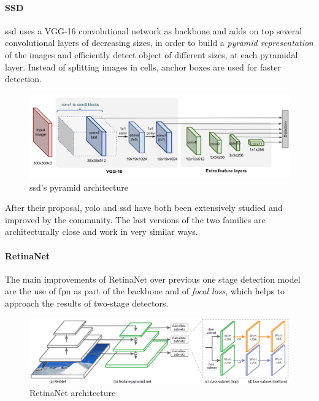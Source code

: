 \documentclass[%
    corpo=12pt,
    twoside,
    stile=classica,   
    tipotesi=magistrale,
    evenboxes,
    english,
	numerazioneromana,
]{toptesi}
\begin{document}
\paragraph{SSD}
\gls{ssd}\cite{Liu_2016} uses a VGG-16 convolutional network as backbone and adds on top several convolutional layers of decreasing sizes, in order to build a \textit{pyramid representation} of the images and efficiently detect object of different sizes, at each pyramidal layer. Instead of splitting images in cells, anchor boxes are used for faster detection.

\begin{figure}[ht]
	\centering
	\includegraphics[width=.9\linewidth]{imgs/SSD-architecture.png}
	\caption{\acrshort{ssd}'s pyramid architecture\cite{objdetpart4}}
	\label{fig:ssd}
\end{figure}

After their proposal, \gls{yolo} and \gls{ssd} have both been extensively studied and improved by the community. The last versions of the two families are architecturally close and work in very similar ways.

\paragraph{RetinaNet}
The main improvements of RetinaNet\cite{lin2018focal} over previous one stage detection model are the use of \gls{fpn} as part of the backbone and of \textit{focal loss}, which helps to approach the results of two-stage detectors.

\begin{figure}[b]
	\centering
	\includegraphics[width=\linewidth]{imgs/retinanet.png}
	\caption{RetinaNet architecture\cite{lin2018focal}}
	\label{fig:retinanet}
\end{figure}
\end{document}
